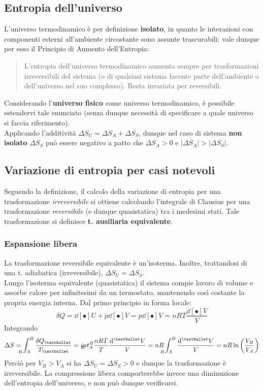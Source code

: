 \documentclass[10pt, oneside]{book}
\newcommand{\clausius}[2]{\frac{\delta Q_{#1}}{T_{#2}}}
\newcommand{\ds}{\displaystyle}
\begin{document}
\subsection{Entropia dell'universo}
L'universo termodinamico è per definizione \textbf{isolato}, in quanto le interazioni con componenti esterni all'ambiente circostante sono assunte trascurabili: vale dunque per esso il Principio di Aumento dell'Entropia:
\begin{quote}
L'entropia dell'universo termodinamico aumenta sempre per trasformazioni irreversibili del sistema (o di qualsiasi sistema facente parte dell'ambiente o dell'universo nel suo complesso). Resta invariata per reversibili.
\end{quote}
Considerando l'\textbf{universo fisico} come universo termodinamico, è possibile estendervi tale enunciato (senza dunque necessità di specificare a quale universo si faccia riferimento).\\
Applicando l'additività $\ds \Delta S_U = \Delta S_A + \Delta S_S$, dunque nel caso di sistema \textbf{non isolato} $\Delta S_S$ può essere negativo a patto che $\Delta S_A > 0$ e $|\Delta S_A| > |\Delta S_S|$.

\subsection{Variazione di entropia per casi notevoli}
Seguendo la definizione, il calcolo della variazione di entropia per una trasformazione \textit{irreversibile} si ottiene calcolando l'integrale di Clausius per una trasformazione \textit{reversibile} (e dunque quasistatica) tra i medesimi stati. Tale trasformazione si definisce \textbf{t. ausiliaria equivalente}.

\subsubsection{Espansione libera}
La trasformazione reversibile equivalente è un'isoterma. Inoltre, trattandosi di una t. adiabatica (irreversibile), $\Delta S_U = \Delta S_S$.\\
Lungo l'isoterma equivalente (quasistatica) il sistema compie lavoro di volume e assorbe calore per infinitesimi da un termostato, mantenendo così costante la propria energia interna. Dal primo principio in forma locale:
\[\delta Q = \dd[•]{U} + p \dd[•]{V} = p \dd[•]{V} = nR T \frac{\dd[•]{V}}{V}\]
Integrando
\[\Delta S = \int_{\hspace{-0.45cm} R \hspace{0.22cm} A}^B \clausius{•}{•} = \\int_{\hspace{-0.45cm} R \hspace{0.22cm} A}^B \frac{nRT}{T} \frac{\dd[•]{V}}{V} = nR \int_{\hspace{-0.45cm} R \hspace{0.22cm} A}^B \frac{\dd[•]{V}}{V} = nR \ln \bigg( \frac{V_B}{V_A} \bigg)\]
Perciò per $V_B > V_A$ si ha $\Delta S_U = \Delta S_S > 0$ e dunque la trasformazione è irreversibile. La compressione libera comporterebbe invece una diminuzione dell'entropia dell'universo, e non può dunque verificarsi.\\
\end{document}
